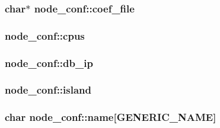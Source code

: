 \subsubsection[{\texorpdfstring{coef\+\_\+file}{coef_file}}]{\setlength{\rightskip}{0pt plus 5cm}char$\ast$ node\+\_\+conf\+::coef\+\_\+file}\hypertarget{structnode__conf_ad9723183ea63ac722e796964b038ce07}{}\label{structnode__conf_ad9723183ea63ac722e796964b038ce07}
\subsubsection[{\texorpdfstring{cpus}{cpus}}]{ node\+\_\+conf\+::cpus}\hypertarget{structnode__conf_af59daa367ed9d4389f86d37cf9bbe210}{}\label{structnode__conf_af59daa367ed9d4389f86d37cf9bbe210}
\subsubsection[{\texorpdfstring{db\+\_\+ip}{db_ip}}]{ node\+\_\+conf\+::db\+\_\+ip}\hypertarget{structnode__conf_a02ff62f2f367c209defd3a9a73ca2b9a}{}\label{structnode__conf_a02ff62f2f367c209defd3a9a73ca2b9a}
\subsubsection[{\texorpdfstring{island}{island}}]{ node\+\_\+conf\+::island}\hypertarget{structnode__conf_ab6cfb5577496d8b6d28734123cf9a9e1}{}\label{structnode__conf_ab6cfb5577496d8b6d28734123cf9a9e1}
\subsubsection[{\texorpdfstring{name}{name}}]{\setlength{\rightskip}{0pt plus 5cm}char node\+\_\+conf\+::name\mbox{[}{\bf G\+E\+N\+E\+R\+I\+C\+\_\+\+N\+A\+ME}\mbox{]}}\hypertarget{structnode__conf_af7a1d41dae2d2eb9788efb97974ba3d5}{}\label{structnode__conf_af7a1d41dae2d2eb9788efb97974ba3d5}

